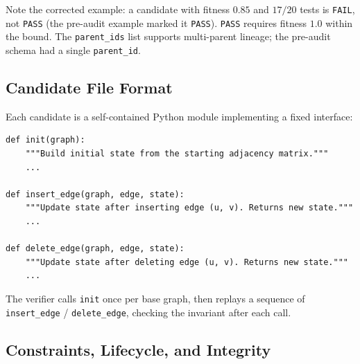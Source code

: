 \documentclass[12pt,a4paper]{article}
\begin{document}
Note the corrected example: a candidate with fitness $0.85$ and $17/20$ tests is \texttt{FAIL}, not \texttt{PASS} (the pre-audit example marked it \texttt{PASS}). \texttt{PASS} requires fitness $1.0$ within the bound. The \texttt{parent\_ids} list supports multi-parent lineage; the pre-audit schema had a single \texttt{parent\_id}.

\subsection{Candidate File Format}

Each candidate is a self-contained Python module implementing a fixed interface:

\begin{verbatim}
def init(graph):
    """Build initial state from the starting adjacency matrix."""
    ...

def insert_edge(graph, edge, state):
    """Update state after inserting edge (u, v). Returns new state."""
    ...

def delete_edge(graph, edge, state):
    """Update state after deleting edge (u, v). Returns new state."""
    ...
\end{verbatim}

The verifier calls \texttt{init} once per base graph, then replays a sequence of \texttt{insert\_edge} / \texttt{delete\_edge}, checking the invariant after each call.

\subsection{Constraints, Lifecycle, and Integrity}
\end{document}
